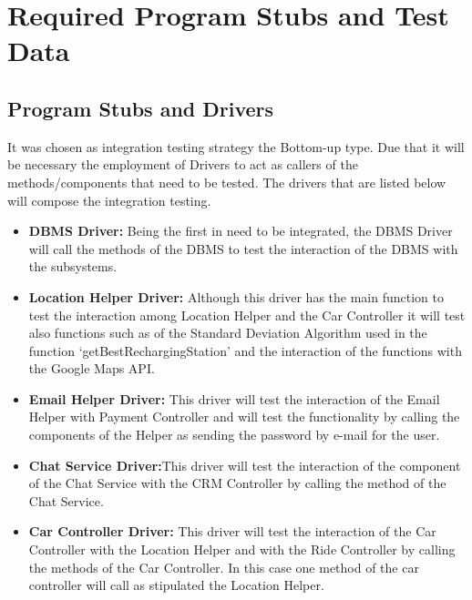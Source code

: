 \documentclass[a4paper]{article}
\begin{document}
\section{Required Program Stubs and Test Data}

\subsection{Program Stubs and Drivers}
It was chosen as integration testing strategy the Bottom-up type. Due that it will be necessary the employment of Drivers to act as callers of the methods/components that need to be tested. The drivers that are listed below will compose the integration testing.
\begin{itemize}
\item \textbf{DBMS Driver:} Being the first in need to be integrated, the DBMS Driver will call the methods of the DBMS to test the interaction of the DBMS with the subsystems.

\item \textbf{Location Helper Driver:} Although this driver has the main function to test the interaction among Location Helper and the Car Controller it will test also functions such as of the Standard Deviation Algorithm used in the function ‘getBestRechargingStation’ and the interaction of the functions with the Google Maps API.

\item \textbf{Email Helper Driver:} This driver will test the interaction of the Email Helper with Payment Controller and will test the functionality by calling the components of the Helper as sending the password by e-mail for the user.

\item \textbf{Chat Service Driver:}This driver will test the interaction of the component of the Chat Service with the CRM Controller by calling the method of the Chat Service.

\item \textbf{Car Controller Driver:} This driver will test the interaction of the  Car Controller with the Location Helper and with the Ride Controller by calling the methods of the Car Controller. In this case one method of the car controller will call as stipulated the Location Helper.  


\end{itemize}
\end{document}
